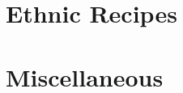 \documentclass[12pt]{memoir} %
\begin{document}










\part{Ethnic Recipes}






%

\part{Miscellaneous}


\printindex
\end{document}
